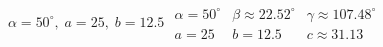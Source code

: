 { $\alpha = 50^{\circ}, \; a = 25, \; b = 12.5$ \label{lastlawofsines}}
{$\begin{array}{lll}\alpha = 50^{\circ} & \beta \approx 22.52^{\circ} & \gamma \approx 107.48^{\circ} \\a = 25 & b = 12.5 & c \approx 31.13 \end{array}$}
